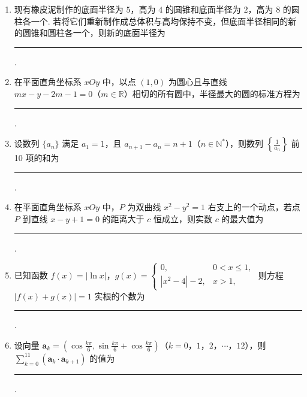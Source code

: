 \begin{description}
\begin{enumerate}[leftmargin=5pt]
        \item 现有橡皮泥制作的底面半径为 \(5\)，高为 \(4\) 的圆锥和底面半径为 \(2\)，高为 \(8\) 的圆柱各一个. 若将它们重新制作成总体积与高均保持不变，但底面半径相同的新的圆锥和圆柱各一个，则新的底面半径为\rule[-0.3ex]{3em}{0.4pt}.

        \item 在平面直角坐标系 \(xOy\) 中，以点 \((1,0)\) 为圆心且与直线 \(mx - y - 2m - 1 = 0\)（\(m \in \mathbb{R}\)）相切的所有圆中，半径最大的圆的标准方程为\rule[-0.3ex]{3em}{0.4pt}.

        \item 设数列 \(\{a_n\}\) 满足 \(a_1 = 1\)，且 \(a_{n+1} - a_n = n + 1\)（\(n \in \mathbb{N}^*\)），则数列 \(\left\{\frac{1}{a_n}\right\}\) 前 10 项的和为\rule[-0.3ex]{3em}{0.4pt}.

        \item 在平面直角坐标系 \(xOy\) 中，\(P\) 为双曲线 \(x^{2} - y^{2} = 1\) 右支上的一个动点，若点 \(P\) 到直线 \(x - y + 1 = 0\) 的距离大于 \(c\) 恒成立，则实数 \(c\) 的最大值为\rule[-0.3ex]{3em}{0.4pt}.

        \item 已知函数 \(f(x) = |\ln x|\)，\(g(x) = \begin{cases}
0, & 0 < x \leqslant 1,\\
|x^2 - 4| - 2, & x > 1,
\end{cases}\) 则方程 \(|f(x) + g(x)| = 1\) 实根的个数为\rule[-0.3ex]{3em}{0.4pt}.

        \item 设向量 \(\bm{a}_k = \left(\cos \frac{k\pi}{6}, \sin \frac{k\pi}{6} + \cos \frac{k\pi}{6}\right)\)（\(k = 0\)，\(1\)，\(2\)，\(\cdots\)，\(12\)），则 \(\sum_{k=0}^{11} (\bm{a}_k \cdot \bm{a}_{k+1})\) 的值为\rule[-0.3ex]{3em}{0.4pt}.

    \end{enumerate}

\end{description}


